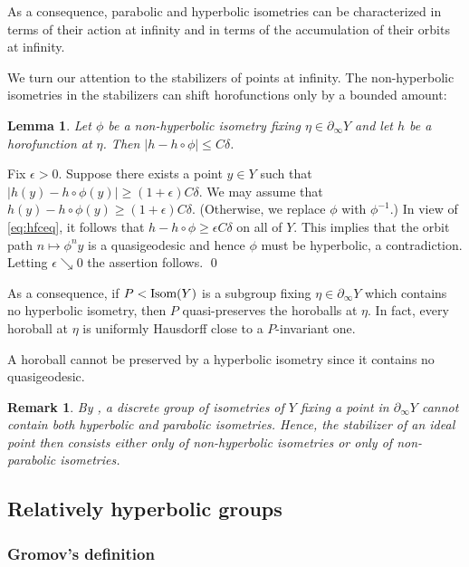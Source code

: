 \documentclass[12pt]{article}
\theoremstyle{boldplain}
\newtheorem{lem}[equation]{Lemma}
\theoremstyle{bolddefinition}
\newtheorem{rem}[equation]{Remark}
\numberwithin{equation}{section}
\def\de{\delta}
\def\eps{\epsilon}
\def\geo{\partial_{\infty}}
\def\Isom{\mathop{\hbox{Isom}}}
\begin{document}
\medskip
As a consequence,
parabolic and hyperbolic isometries can be characterized in terms of their action at infinity
and in terms of the accumulation of their orbits at infinity.

\medskip
We turn our attention to the stabilizers of points at infinity.
The non-hyperbolic isometries in the stabilizers can shift horofunctions only by a bounded amount:
\begin{lem}
Let $\phi$ be a non-hyperbolic isometry fixing $\eta\in\geo Y$ 
and let $h$ be a horofunction at $\eta$.
Then $|h-h\circ\phi|\leq C\de$.
\end{lem}
\proof
Fix $\eps>0$.
Suppose there exists a point $y\in Y$ such that 
$|h(y)-h\circ\phi(y)|\geq(1+\eps)C\de$.
We may assume that $h(y)-h\circ\phi(y)\geq(1+\eps)C\de$.
(Otherwise, we replace $\phi$ with $\phi^{-1}$.)
In view of \eqref{eq:hfceq}, it follows that $h-h\circ\phi \geq \eps C\de$ on all of $Y$.
This implies that the orbit path $n\mapsto\phi^ny$ is a quasigeodesic
and hence $\phi$ must be hyperbolic,
a contradiction. 
Letting $\eps\searrow0$ the assertion follows. 
\qed

\medskip
As a consequence,
if $P<\Isom(Y)$ is a subgroup fixing $\eta\in \geo Y$ which contains no hyperbolic isometry,
then $P$ quasi-preserves the horoballs at $\eta$.
In fact,
every horoball at $\eta$ is uniformly Hausdorff close to a $P$-invariant one. 

A horoball cannot be preserved by a hyperbolic isometry since it contains no quasigeodesic.



\begin{rem}
By \cite[Thm. 2G]{Tukia1994}, 
a discrete group of isometries of $Y$ fixing a point in $\geo Y$ cannot contain both hyperbolic and parabolic isometries. 
Hence, the stabilizer of an ideal point then consists either only of non-hyperbolic isometries 
or only of non-parabolic isometries.
\end{rem}



\subsection{Relatively hyperbolic groups} 
\subsubsection{Gromov's definition}
\label{sec:grdfn}
\end{document}
